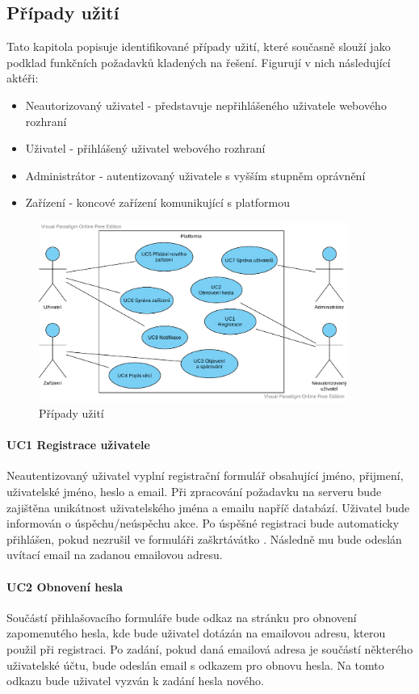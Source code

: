 \subsection{Případy užití}
Tato kapitola popisuje identifikované případy užití, které současně slouží jako podklad funkčních požadavků kladených na řešení. Figurují v nich následující aktéři:
\begin{itemize}
    \item Neautorizovaný uživatel - představuje nepřihlášeného uživatele webového rozhraní
    \item Uživatel - přihlášený uživatel webového rozhraní
    \item Administrátor - autentizovaný uživatele s vyšším stupněm oprávnění
    \item Zařízení - koncové zařízení komunikující s platformou
\end{itemize}

\begin{figure}[htbp]
    \centering
    \includegraphics[width=0.9\textwidth]{img/use_case.pdf}
    \caption{Případy užití}
\end{figure}

\paragraph{UC1 Registrace uživatele}
Neautentizovaný uživatel vyplní registrační formulář obsahující jméno, přijmení, uživatelské jméno, heslo a email. Při zpracování požadavku na serveru bude zajištěna unikátnost uživatelského jména a emailu napříč databází. Uživatel bude informován o úspěchu/neúspěchu akce. Po úspěšné registraci bude automaticky přihlášen, pokud nezrušil ve formuláři zaškrtávátko . Následně mu bude odeslán uvítací email na zadanou emailovou adresu.

\paragraph{UC2 Obnovení hesla}
Součástí přihlašovacího formuláře bude odkaz na stránku pro obnovení zapomenutého hesla, kde bude uživatel dotázán na emailovou adresu, kterou použil při registraci. Po zadání, pokud daná emailová adresa je součástí některého uživatelské účtu, bude odeslán email s odkazem pro obnovu hesla. Na tomto odkazu bude uživatel vyzván k zadání hesla nového.

